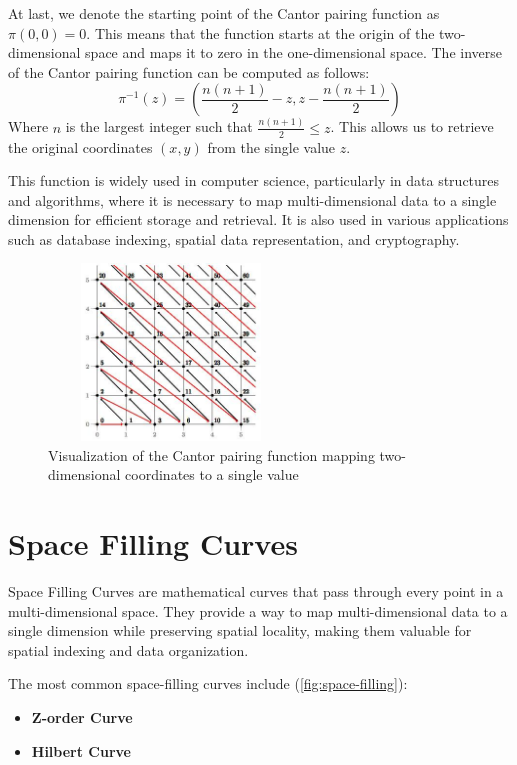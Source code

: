 At last, we denote the starting point of the Cantor pairing function as \( \pi(0, 0) = 0 \). This means that the function starts at the origin of the two-dimensional space and maps it to zero in the one-dimensional space. The inverse of the Cantor pairing function can be computed as follows:
\[
    \pi^{-1}(z) = \left( \frac{n(n + 1)}{2} - z, z - \frac{n(n + 1)}{2} \right)
\]
Where \( n \) is the largest integer such that \( \frac{n(n + 1)}{2} \leq z \). This allows us to retrieve the original coordinates \( (x, y) \) from the single value \( z \).

This function is widely used in computer science, particularly in data structures and algorithms, where it is necessary to map multi-dimensional data to a single dimension for efficient storage and retrieval. It is also used in various applications such as database indexing, spatial data representation, and cryptography.


\vspace{5mm}

\begin{figure}[h]
    \centering
    \includegraphics[width=6.5cm,height=4.7cm]{img/cantor-pairing.jpg}
    \caption{Visualization of the Cantor pairing function mapping two-dimensional coordinates to a single value}
    \label{fig:cantor}
\end{figure}

\vspace{5mm}

\section{Space Filling Curves}
Space Filling Curves are mathematical curves that pass through every point in a multi-dimensional space. They provide a way to map multi-dimensional data to a single dimension while preserving spatial locality, making them valuable for spatial indexing and data organization.

The most common space-filling curves include (\cref{fig:space-filling}):
\begin{itemize}
    \item \textbf{Z-order Curve}
    \item \textbf{Hilbert Curve}
\end{itemize}

